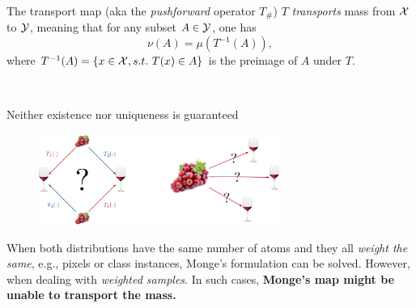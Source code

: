 \documentclass[pdf,aspectratio=169,10pt]{beamer}
\begin{document}
\begin{frame}{The transport map (aka the \emph{pushforward} operator $T_\#$)}
    $T$ \emph{transports} mass from ${\mathcal{X}}$ to ${\mathcal{Y}}$, meaning that for any subset $A\in{\mathcal{Y}}$, one has 
    \begin{equation}
        \nu(A) = \mu(T^{-1}(A)),
    \end{equation}
    where $T^{-1}(A)=\{x\in{\mathcal{X}}, s.t.\ T(x)\in A \}$ is the preimage of $A$ under $T$.
\vspace{2em}

\\
\end{frame}






\begin{frame}{ Neither existence nor uniqueness is guaranteed}
        \begin{figure}
        \includegraphics[width=0.7\textwidth]{../img/existence_uniqueness.pdf}
    \end{figure}
    \vspace{1em}
 When both distributions have the same number of atoms and they all \emph{weight the same}, e.g., pixels or class instances, Monge's formulation can be solved. However, when dealing with \emph{weighted samples}. In such cases, \textbf{Monge's map might be unable to transport the mass.}
\end{frame}
\end{document}
